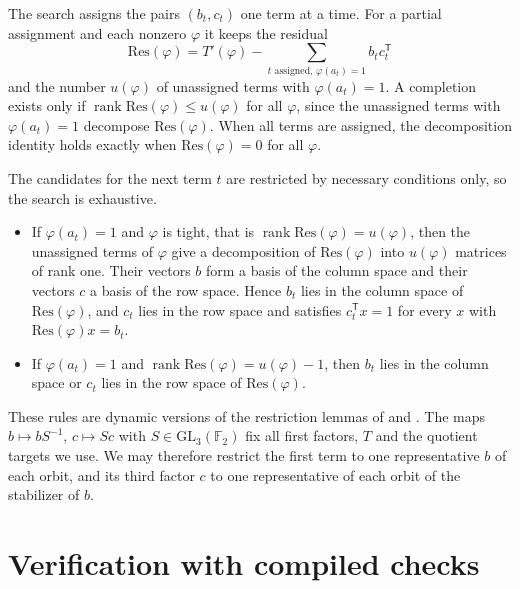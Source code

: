 \documentclass[11pt]{amsart}
\theoremstyle{definition}
\theoremstyle{remark}
\numberwithin{equation}{section}
\newcommand{\F}{\mathbb{F}_2}
\newcommand{\GL}{\mathrm{GL}_3(\F)}
\newcommand{\rk}{\operatorname{rank}}
\begin{document}
The search assigns the pairs $(b_t,c_t)$ one term at a time. For a partial assignment and each nonzero $\varphi$ it keeps the residual
\[
\mathrm{Res}(\varphi)=T'(\varphi)-\sum_{t\text{ assigned},\,\varphi(a_t)=1}b_tc_t^{\mathsf T}
\]
and the number $u(\varphi)$ of unassigned terms with $\varphi(a_t)=1$. A completion exists only if $\rk\mathrm{Res}(\varphi)\le u(\varphi)$ for all $\varphi$, since the unassigned terms with $\varphi(a_t)=1$ decompose $\mathrm{Res}(\varphi)$. When all terms are assigned, the decomposition identity holds exactly when $\mathrm{Res}(\varphi)=0$ for all $\varphi$.

The candidates for the next term $t$ are restricted by necessary conditions only, so the search is exhaustive.
\begin{itemize}
\item If $\varphi(a_t)=1$ and $\varphi$ is tight, that is $\rk\mathrm{Res}(\varphi)=u(\varphi)$, then the unassigned terms of $\varphi$ give a decomposition of $\mathrm{Res}(\varphi)$ into $u(\varphi)$ matrices of rank one. Their vectors $b$ form a basis of the column space and their vectors $c$ a basis of the row space. Hence $b_t$ lies in the column space of $\mathrm{Res}(\varphi)$, and $c_t$ lies in the row space and satisfies $c_t^{\mathsf T}x=1$ for every $x$ with $\mathrm{Res}(\varphi)x=b_t$.
\item If $\varphi(a_t)=1$ and $\rk\mathrm{Res}(\varphi)=u(\varphi)-1$, then $b_t$ lies in the column space or $c_t$ lies in the row space of $\mathrm{Res}(\varphi)$.
\end{itemize}
These rules are dynamic versions of the restriction lemmas of \cite[Lemmas~2 and~3]{DAm26} and \cite[Lemma~4.1]{Wan26b}.
The maps $b\mapsto bS^{-1}$, $c\mapsto Sc$ with $S\in\GL$ fix all first factors, $T$ and the quotient targets we use. We may therefore restrict the first term to one representative $b$ of each orbit, and its third factor $c$ to one representative of each orbit of the stabilizer of $b$.


\section{Verification with compiled checks}\label{sec:verify}
\end{document}
